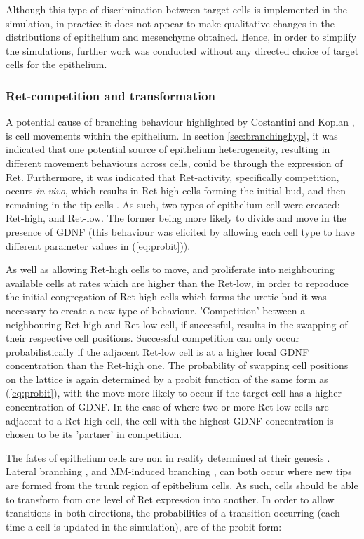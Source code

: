 \documentclass[pdftex,10pt,a4paper,twocolumn]{article}
\begin{document}
Although this type of discrimination between target cells is implemented in the simulation, in practice it does not appear to make qualitative changes in the distributions of epithelium and mesenchyme obtained. Hence, in order to simplify the simulations, further work was conducted without any directed choice of target cells for the epithelium.

\subsubsection{Ret-competition and transformation}
A potential cause of branching behaviour highlighted by Costantini and Koplan \cite{CostantiniFKopan2010}, is cell movements within the epithelium. In section \ref{sec:branchinghyp}, it was indicated that one potential source of epithelium heterogeneity, resulting in different movement behaviours across cells, could be through the expression of Ret. Furthermore, it was indicated that Ret-activity, specifically competition, occurs \textit{in vivo}, which results in Ret-high cells forming the initial bud, and then remaining in the tip cells \cite{Chi2009}. As such, two types of epithelium cell were created: Ret-high, and Ret-low. The former being more likely to divide and move in the presence of GDNF (this behaviour was elicited by allowing each cell type to have different parameter values in (\ref{eq:probit})).

As well as allowing Ret-high cells to move, and proliferate into neighbouring available cells at rates which are higher than the Ret-low, in order to reproduce the initial congregation of Ret-high cells which forms the uretic bud it was necessary to create a new type of behaviour. 'Competition' between a neighbouring Ret-high and Ret-low cell, if successful, results in the swapping of their respective cell positions. Successful competition can only occur probabilistically if the adjacent Ret-low cell is at a higher local GDNF concentration than the Ret-high one. The probability of swapping cell positions on the lattice is again determined by a probit function of the same form as (\ref{eq:probit}), with the move more likely to occur if the target cell has a higher concentration of GDNF. In the case of where two or more Ret-low cells are adjacent to a Ret-high cell, the cell with the highest GDNF concentration is chosen to be its 'partner' in competition.

The fates of epithelium cells are non in reality determined at their genesis \cite{CostantiniFKopan2010}. Lateral branching \cite{watanabe2004real}, and MM-induced branching \cite{sweeney2008developmental}, can both occur where new tips are formed from the trunk region of epithelium cells. As such, cells should be able to transform from one level of Ret expression into another. In order to allow transitions in both directions, the probabilities of a transition occurring (each time a cell is updated in the simulation), are of the probit form:
\end{document}

